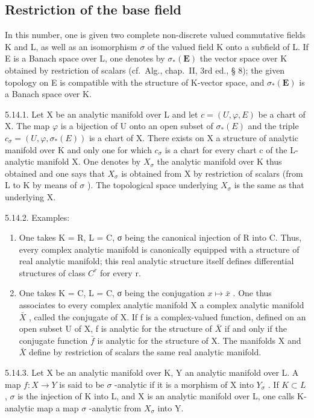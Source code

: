 \subsection{Restriction of the base field}

In this number, one is given two complete non-discrete valued commutative fields K and L, as well as an isomorphism \(\sigma\) of the valued field K onto a subfield of L. If E is a Banach space over L, one denotes by \(\sigma_{*}(\mathbf{E})\) the vector space over K obtained by restriction of scalars (cf.~Alg., chap.~II, 3rd ed., § 8); the given topology on E is compatible with the structure of K-vector space, and \(\sigma_{*}(\mathbf{E})\) is a Banach space over K.

5.14.1. Let X be an analytic manifold over L and let \(c = (U, \varphi, E)\) be a chart of X. The map \(\varphi\) is a bijection of U onto an open subset of \(\sigma_{*}(E)\) and the triple \(c_{\sigma} = (U, \varphi, \sigma_{*}(E))\) is a chart of X. There exists on X a structure of analytic manifold over K and only one for which \(c_{\sigma}\) is a chart for every chart c of the L-analytic manifold X. One denotes by \(X_{\sigma}\) the analytic manifold over K thus obtained and one says that \(X_{\sigma}\) is obtained from X by restriction of scalars (from L to K by means of \(\sigma\) ). The topological space underlying \(X_{\sigma}\) is the same as that underlying X.

5.14.2. Examples:

\begin{enumerate}
\def\labelenumi{(\alph{enumi})}
\item
  One takes K = R, L = C, σ being the canonical injection of R into C. Thus, every complex analytic manifold is canonically equipped with a structure of real analytic manifold; this real analytic structure itself defines differential structures of class \(C^{r}\) for every r.
\item
  One takes K = C, L = C, σ being the conjugation \(x \mapsto \bar{x}\) . One thus associates to every complex analytic manifold X a complex analytic manifold \(\bar{X}\) , called the conjugate of X. If f is a complex-valued function, defined on an open subset U of X, f is analytic for the structure of \(\bar{X}\) if and only if the conjugate function \(\bar{f}\) is analytic for the structure of X. The manifolds X and \(\bar{X}\) define by restriction of scalars the same real analytic manifold.
\end{enumerate}

5.14.3. Let X be an analytic manifold over K, Y an analytic manifold over L. A map \(f:X\to Y\) is said to be \(\sigma\) -analytic if it is a morphism of X into \(Y_{\sigma}\) . If \(K\subset L\) , \(\sigma\) is the injection of K into L, and X is an analytic manifold over L, one calls K-analytic map a map \(\sigma\) -analytic from \(X_{\sigma}\) into Y.

